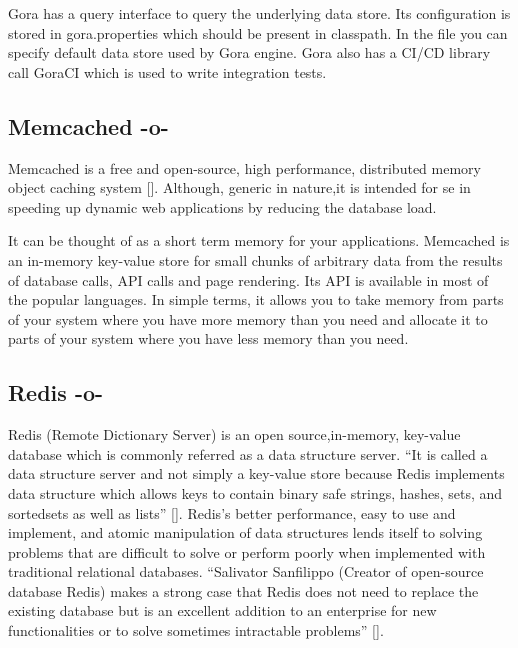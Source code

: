Gora has a query interface to query the underlying data store. Its
configuration is stored in gora.properties which should be present in
classpath. In the file you can specify default data store used by Gora
engine. Gora also has a CI/CD library call GoraCI which is used to
write integration tests.



\subsection{Memcached -o-}

Memcached is a free and open-source, high performance, distributed
memory object caching system [\cite{www-memcached}].  Although,
generic in nature,it is intended for se in speeding up dynamic web
applications by reducing the database load.

It can be thought of as a short term memory for your applications.
Memcached is an in-memory key-value store for small chunks of
arbitrary data from the results of database calls, API calls and page
rendering. Its API is available in most of the popular languages. In
simple terms, it allows you to take memory from parts of your system
where you have more memory than you need and allocate it to parts of
your system where you have less memory than you need.


     
\subsection{Redis -o-}

Redis (Remote Dictionary Server) is an open source,in-memory,
key-value database which is commonly referred as a data structure
server. ``It is called a data structure server and not simply a
key-value store because Redis implements data structure which allows
keys to contain binary safe strings, hashes, sets, and sortedsets as
well as lists'' [\cite{redis-book-2011}].  Redis's better performance,
easy to use and implement, and atomic manipulation of data structures
lends itself to solving problems that are difficult to solve or
perform poorly when implemented with traditional relational
databases. ``Salivator Sanfilippo (Creator of open-source database
Redis) makes a strong case that Redis does not need to replace the
existing database but is an excellent addition to an enterprise for
new functionalities or to solve sometimes intractable problems''
[\cite{redis-book-2016}].


